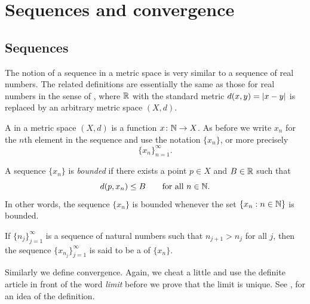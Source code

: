 
\sectionnewpage
\section{Sequences and convergence}
\label{sec:metseqs}


\subsection{Sequences}

The notion of a sequence in a metric space is very similar to a sequence of
real numbers.
The related definitions are essentially the same as those for real numbers
in the sense of , where ${\mathbb{R}}$ with
the standard metric $d(x,y)=\left\lvert {x-y} \right\rvert$ is replaced
by an arbitrary metric space $(X,d)$.


\begin{defn}
A \emph{} in a metric space $(X,d)$ is a function
$x \colon {\mathbb{N}} \to X$.  As before we write $x_n$ for the $n$th element in
the sequence and use the notation $\{ x_n \}$, or more precisely
\begin{equation*}
\{ x_n \}_{n=1}^\infty .
\end{equation*}

A sequence $\{ x_n \}$ is \emph{bounded} if
there exists a point $p \in X$ and $B \in {\mathbb{R}}$ such that
\begin{equation*}
d(p,x_n) \leq B \qquad \text{for all $n \in {\mathbb{N}}$.}
\end{equation*}
In other words, the sequence $\{x_n\}$ is bounded whenever
the set $\{ x_n : n \in {\mathbb{N}} \}$
is bounded.

If $\{ n_j \}_{j=1}^\infty$ is a sequence of natural numbers
such that $n_{j+1} > n_j$ for all $j$, then
the sequence $\{ x_{n_j} \}_{j=1}^\infty$
is said to be
a \emph{} of $\{x_n \}$.
\end{defn}

Similarly we define convergence.  Again, we cheat a little
and use the definite article in front of the word \emph{limit}
before we prove that the limit is unique.
See , for an idea of
the definition.

